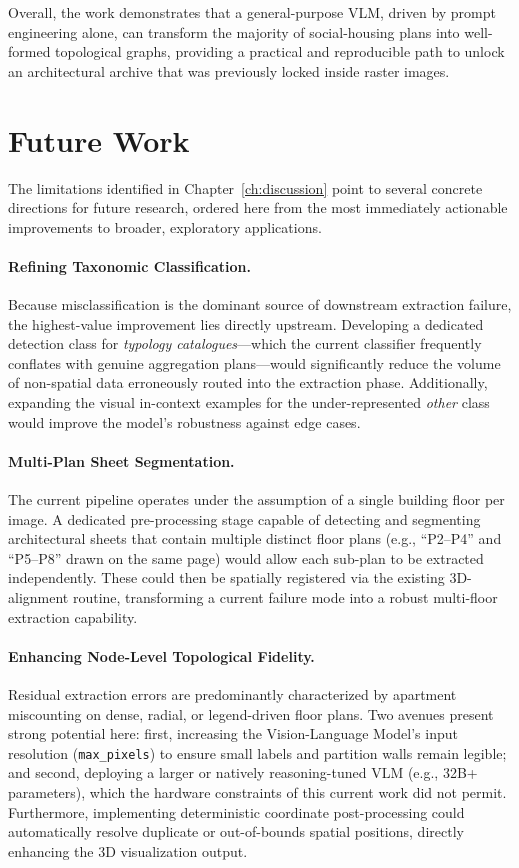 \documentclass[12pt,a4paper,openright]{report}
\begin{document}
Overall, the work demonstrates that a general-purpose VLM, driven by prompt engineering alone, can transform the majority of social-housing plans into well-formed topological graphs, providing a practical and reproducible path to unlock an architectural archive that was previously locked inside raster images.

\section{Future Work}
\label{sec:future_work}

The limitations identified in Chapter~\ref{ch:discussion} point to several concrete directions for future research, ordered here from the most immediately actionable improvements to broader, exploratory applications.

\paragraph{Refining Taxonomic Classification.} Because misclassification is the dominant source of downstream extraction failure, the highest-value improvement lies directly upstream. Developing a dedicated detection class for \textit{typology catalogues}---which the current classifier frequently conflates with genuine aggregation plans---would significantly reduce the volume of non-spatial data erroneously routed into the extraction phase. Additionally, expanding the visual in-context examples for the under-represented \textit{other} class would improve the model's robustness against edge cases.

\paragraph{Multi-Plan Sheet Segmentation.} The current pipeline operates under the assumption of a single building floor per image. A dedicated pre-processing stage capable of detecting and segmenting architectural sheets that contain multiple distinct floor plans (e.g., ``P2--P4'' and ``P5--P8'' drawn on the same page) would allow each sub-plan to be extracted independently. These could then be spatially registered via the existing 3D-alignment routine, transforming a current failure mode into a robust multi-floor extraction capability.

\paragraph{Enhancing Node-Level Topological Fidelity.} Residual extraction errors are predominantly characterized by apartment miscounting on dense, radial, or legend-driven floor plans. Two avenues present strong potential here: first, increasing the Vision-Language Model's input resolution (\texttt{max\_pixels}) to ensure small labels and partition walls remain legible; and second, deploying a larger or natively reasoning-tuned VLM (e.g., 32B+ parameters), which the hardware constraints of this current work did not permit. Furthermore, implementing deterministic coordinate post-processing could automatically resolve duplicate or out-of-bounds spatial positions, directly enhancing the 3D visualization output.
\end{document}
